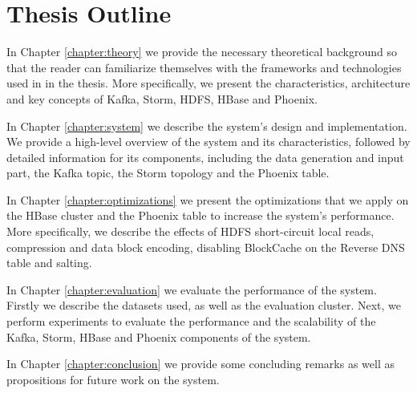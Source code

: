 \section{Thesis Outline}

In Chapter \ref{chapter:theory} we provide the necessary theoretical background so that the reader can familiarize themselves with the frameworks and technologies used in in the thesis. More specifically, we present the characteristics, architecture and key concepts of Kafka, Storm, HDFS, HBase and Phoenix.

In Chapter \ref{chapter:system} we describe the system's design and implementation. We provide a high-level overview of the system and its characteristics, followed by detailed information for its components, including the data generation and input part, the Kafka topic, the Storm topology and the Phoenix table.

In Chapter \ref{chapter:optimizations} we present the optimizations that we apply on the HBase cluster and the Phoenix table to increase the system's performance. More specifically, we describe the effects of HDFS short-circuit local reads, compression and data block encoding, disabling BlockCache on the Reverse DNS table and salting.

In Chapter \ref{chapter:evaluation} we evaluate the performance of the system. Firstly we describe the datasets used, as well as the evaluation cluster. Next, we perform experiments to evaluate the performance and the scalability of the Kafka, Storm, HBase and Phoenix components of the system.

In Chapter \ref{chapter:conclusion} we provide some concluding remarks as well as propositions for future work on the system.


\cleardoublepage
